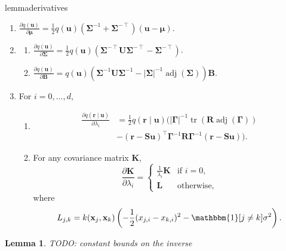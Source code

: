 \documentclass{mpaper}
\newtheorem{lemma}[theorem]{Lemma}
\DeclareMathOperator{\adj}{adj}
\DeclareMathOperator{\tr}{tr}
\begin{document}
\begin{restatable}{lemma}{derivatives} \label{lemma:derivatives}
  \leavevmode
  \begin{enumerate}
  \item $\frac{\partial q(\mathbf{u})}{\partial \bm\mu} =
    \frac{1}{2}q(\mathbf{u})(\bm\Sigma^{-1} + \bm\Sigma^{-\intercal})(\mathbf{u}
    - \bm\mu)$.
  \item
    \begin{enumerate}
    \item
      $\frac{\partial q(\mathbf{u})}{\partial \bm\Sigma} =
      \frac{1}{2}q(\mathbf{u})(\bm\Sigma^{-\intercal}\mathbf{U}\bm\Sigma^{-\intercal}
      - \bm\Sigma^{-\intercal})$.
    \item
      $\frac{\partial q(\mathbf{u})}{\partial \mathbf{B}} =
      q(\mathbf{u})(\bm\Sigma^{-1}\mathbf{U}\bm\Sigma^{-1} -
      |\bm\Sigma|^{-1}\adj(\bm\Sigma))\mathbf{B}$.
    \end{enumerate}
  \item For $i = 0, \dots, d$,
    \begin{enumerate}
    \item
      \begin{align*}
        \frac{\partial q(\mathbf{r} \mid \mathbf{u})}{\partial \lambda_i} &= \frac{1}{2}q(\mathbf{r} \mid \mathbf{u}) (|\bm\Gamma|^{-1} \tr(\mathbf{R} \adj(\bm\Gamma)) \\
                                                                          &- (\mathbf{r} - \mathbf{Su})^\intercal\bm\Gamma^{-1}\mathbf{R}\bm\Gamma^{-1}(\mathbf{r} - \mathbf{Su})).
      \end{align*}
    \item For any covariance matrix $\mathbf{K}$,
      \[
        \frac{\partial \mathbf{K}}{\partial \lambda_i} =
        \begin{cases}
          \frac{1}{\lambda_i}\mathbf{K} & \text{if } i = 0, \\
          \mathbf{L} & \text{otherwise,}
        \end{cases}
      \]
      where
      \[
        L_{j,k} = k(\mathbf{x}_j, \mathbf{x}_k) \left( -\frac{1}{2}(x_{j,i} -
          x_{k,i})^2 - \mathbbm{1}[j \ne k]\sigma^2 \right).
      \]
    \end{enumerate}
  \end{enumerate}
\end{restatable}

\begin{lemma} \label{lemma:matrix_inverse}
  TODO: constant bounds on the inverse
\end{lemma}
\end{document}
